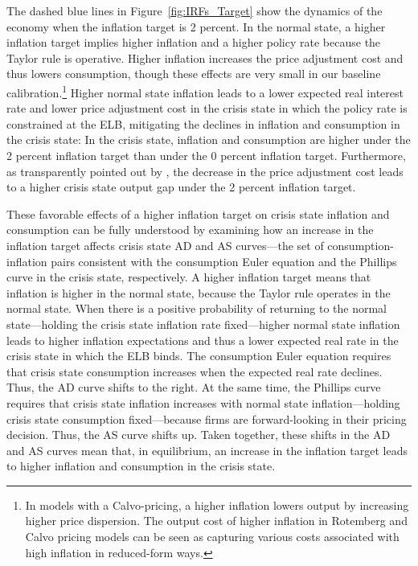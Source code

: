 \documentclass[11pt]{article}
\begin{document}
	The dashed blue lines in Figure~\ref{fig:IRFs_Target} show the dynamics of the economy when the inflation target is 2 percent. In the normal state, a higher inflation target implies higher inflation and a higher policy rate because the Taylor rule is operative. Higher inflation increases the price adjustment cost and thus lowers consumption, though these effects are very small in our baseline calibration.\footnote{In models with a Calvo-pricing, a higher inflation lowers output by increasing higher price dispersion. The output cost of higher inflation in Rotemberg and Calvo pricing models can be seen as capturing various costs associated with high inflation in reduced-form ways.} Higher normal state inflation leads to a lower expected real interest rate and lower price adjustment cost in the crisis state in which the policy rate is constrained at the ELB, mitigating the declines in inflation and consumption in the crisis state: In the crisis state, inflation and consumption are higher under the 2 percent inflation target than under the 0 percent inflation target. Furthermore, as transparently pointed out by \citet{MertensRavn2014}, the decrease in the price adjustment cost leads to a higher crisis state output gap under the 2 percent inflation target.

	These favorable effects of a higher inflation target on crisis state inflation and consumption can be fully understood by examining how an increase in the inflation target affects crisis state AD and AS curves---the set of consumption-inflation pairs consistent with the consumption Euler equation and the Phillips curve in the crisis state, respectively. A higher inflation target means that inflation is higher in the normal state, because the Taylor rule operates in the normal state. When there is a positive probability of returning to the normal state---holding the crisis state inflation rate fixed---higher normal state inflation leads to higher inflation expectations and thus a lower expected real rate in the crisis state in which the ELB binds. The consumption Euler equation requires that crisis state consumption increases when the expected real rate declines. Thus, the AD curve shifts to the right. At the same time, the Phillips curve requires that crisis state inflation increases with normal state inflation---holding crisis state consumption fixed---because firms are forward-looking in their pricing decision. Thus, the AS curve shifts up. Taken together, these shifts in the AD and AS curves mean that, in equilibrium, an increase in the inflation target leads to higher inflation and consumption in the crisis state.
\end{document}
